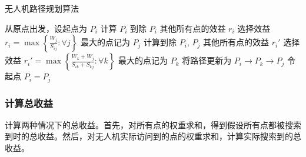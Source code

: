\documentclass[bwprint]{gmcmthesis}
\numberwithin{figure}{section}
\begin{document}
\begin{algorithm}
	\caption{无人机路径规划算法}
	\begin{algorithmic}[1]
		\State 从原点出发，设起点为 $P_i$
		\State 计算 $P_i$ 到除 $P_i$ 其他所有点的效益 $r_i$
		\State 选择效益 $r_i = \max \left\{ \frac{W_j}{S_{ij}} : \forall j \right\}$ 最大的点记为 $P_j$
		\State 计算到除 $P_i$, $P_j$ 其他所有点的效益 $r_i'$
		\State 选择效益 $r_i' = \max \left\{ \frac{W_k + W_j}{S_{ik} + S_{kj}} : \forall k \right\}$ 最大的点记为 $P_k$
		\State 将路径更新为 $P_i \rightarrow P_k \rightarrow P_j$
		\State 令起点 $P_i = P_j$
		\EndWhile
		\EndFor
	\end{algorithmic}
\end{algorithm}

\subsubsection{计算总收益}
计算两种情况下的总收益。首先，对所有点的权重求和，得到假设所有点都被搜索到时的总收益。然后，对无人机实际访问到的点的权重求和，计算实际搜索到的总收益。
\end{document}
